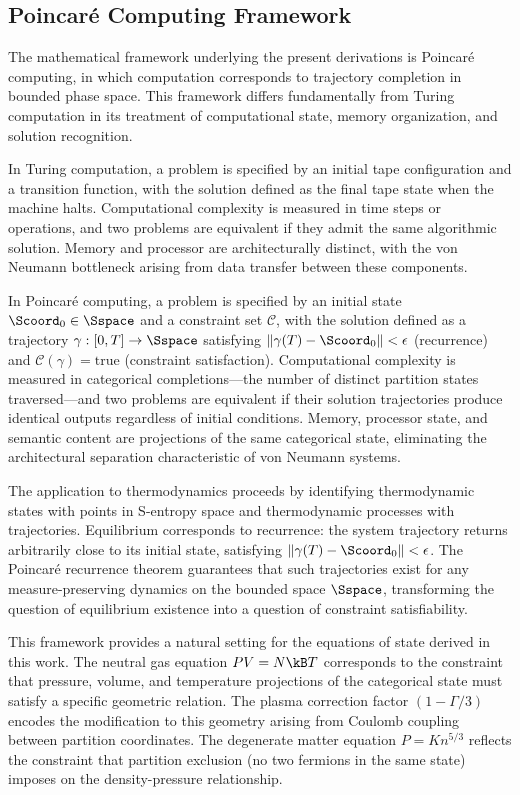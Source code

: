 \subsection{Poincaré Computing Framework}

The mathematical framework underlying the present derivations is Poincaré computing, in which computation corresponds to trajectory completion in bounded phase space. This framework differs fundamentally from Turing computation in its treatment of computational state, memory organization, and solution recognition.

In Turing computation, a problem is specified by an initial tape configuration and a transition function, with the solution defined as the final tape state when the machine halts. Computational complexity is measured in time steps or operations, and two problems are equivalent if they admit the same algorithmic solution. Memory and processor are architecturally distinct, with the von Neumann bottleneck arising from data transfer between these components.

In Poincaré computing, a problem is specified by an initial state $\Scoord_0 \in \Sspace$ and a constraint set $\mathcal{C}$, with the solution defined as a trajectory $\gamma: [0,T] \to \Sspace$ satisfying $\|\gamma(T) - \Scoord_0\| < \epsilon$ (recurrence) and $\mathcal{C}(\gamma) = \text{true}$ (constraint satisfaction). Computational complexity is measured in categorical completions—the number of distinct partition states traversed—and two problems are equivalent if their solution trajectories produce identical outputs regardless of initial conditions. Memory, processor state, and semantic content are projections of the same categorical state, eliminating the architectural separation characteristic of von Neumann systems.

The application to thermodynamics proceeds by identifying thermodynamic states with points in S-entropy space and thermodynamic processes with trajectories. Equilibrium corresponds to recurrence: the system trajectory returns arbitrarily close to its initial state, satisfying $\|\gamma(T) - \Scoord_0\| < \epsilon$. The Poincaré recurrence theorem \citep{poincare1890} guarantees that such trajectories exist for any measure-preserving dynamics on the bounded space $\Sspace$, transforming the question of equilibrium existence into a question of constraint satisfiability.

This framework provides a natural setting for the equations of state derived in this work. The neutral gas equation $PV = N\kB T$ corresponds to the constraint that pressure, volume, and temperature projections of the categorical state must satisfy a specific geometric relation. The plasma correction factor $(1 - \Gamma/3)$ encodes the modification to this geometry arising from Coulomb coupling between partition coordinates. The degenerate matter equation $P = K n^{5/3}$ reflects the constraint that partition exclusion (no two fermions in the same state) imposes on the density-pressure relationship.

